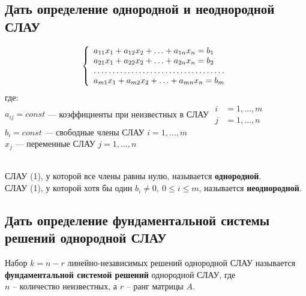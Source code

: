 \newpage
\subsection{Дать определение однородной и неоднородной СЛАУ}
\begin{align}
	\left\{
	\begin{array}{l}
		a_{11}x_1 + a_{12}x_2 + \ldots + a_{1n}x_n = b_1 \\
		a_{21}x_1 + a_{22}x_2 + \ldots + a_{2n}x_n = b_2 \\
		\hdotsfor{1}                                     \\
		a_{m1}x_1 + a_{m2}x_2 + \ldots + a_{mn}x_n = b_m
	\end{array} \right.
\end{align}
где:\\
$a_{ij} = const$ --- коэффициенты при неизвестных в СЛАУ \quad $\begin{aligned}
		i & =1, \ldots, m \\[-3pt]
		j & =1, \ldots, n
	\end{aligned}$\\
$b_i = const$ --- свободные члены СЛАУ \quad $i=1,\ldots,m$\\
$x_j$ --- переменные СЛАУ \quad $j=1,\ldots,n$\\
\begin{definition*}\ \\
	СЛАУ (1), у которой все члены равны нулю, называется \textbf{однородной}.\\
	СЛАУ (1), у которой хотя бы один $b_i \ne 0,\ 0 \le i \le m$, называется \textbf{неоднородной}.
\end{definition*}

\subsection{Дать определение фундаментальной системы решений однородной СЛАУ}
\begin{definition*}
	Набор $k = n-r$ линейно-независимых решений однородной СЛАУ называется \textbf{фундаментальной системой решений} однородной СЛАУ, где\\ $n$ -- количество неизвестных, а $r$ -- ранг матрицы $A$.
\end{definition*}

